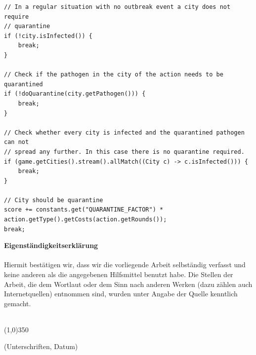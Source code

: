 \documentclass{article}
\begin{document}
\label{code:QuarantineForRest}
\begin{lstlisting}[title={Teil der Quarantäne Evaluation, welche bestimmt, ob der Rest der Welt vor dem Pathogen innerhalb einer Stadt geschützt werden muss.}]
// In a regular situation with no outbreak event a city does not require
// quarantine
if (!city.isInfected()) {
	break;
}

// Check if the pathogen in the city of the action needs to be quarantined
if (!doQuarantine(city.getPathogen())) {
	break;
}

// Check whether every city is infected and the quarantined pathogen can not
// spread any further. In this case there is no quarantine required.
if (game.getCities().stream().allMatch((City c) -> c.isInfected())) {
	break;
}

// City should be quarantine
score += constants.get("QUARANTINE_FACTOR") * action.getType().getCosts(action.getRounds());
break;
\end{lstlisting}
\newpage
\printglossary
\newpage
\noindent
\textbf{Eigenständigkeitserklärung} \\\\
\noindent
 Hiermit bestätigen wir, dass wir die vorliegende Arbeit selbständig verfasst und keine anderen als die angegebenen Hilfsmittel benutzt habe. Die Stellen der Arbeit, die dem Wortlaut oder dem Sinn nach anderen Werken (dazu zählen auch Internetquellen) entnommen sind, wurden unter Angabe der Quelle kenntlich gemacht. \\\\
 
\begin{center}
\line(1,0){350}
\end{center}
(Unterschriften, Datum)
 
\end{document}
